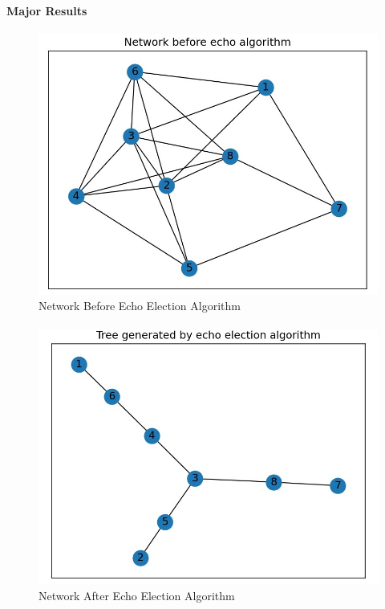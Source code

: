 \documentclass[11pt]{beamer}              %
\begin{document}
\begin{frame}{}
\framesubtitle{Major Results}

\begin{figure}
    \centering
    \includegraphics[scale=0.6]{figures/Screen25.jpg}
    \caption{Network Before Echo Election Algorithm}
    \label{fig:Network Before Echo Election Algorithm}
\end{figure}
\note{
}
\end{frame}


\begin{frame}{}
\framesubtitle{}

\begin{figure}
    \centering
    \includegraphics[scale=0.6]{figures/Screen26.jpg}
    \caption{Network After Echo Election Algorithm}
    \label{fig:Network After Echo Election Algorithm}
\end{figure}
\note{
}
\end{frame}
\end{document}
